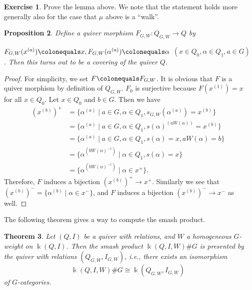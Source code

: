 \documentclass{surv-l}
\makeatletter
\DeclareRobustCommand{\forcelinebreak}{%
    \@ifstar{\unskip\\\ignorespaces}{\unskip\linebreak}%
}
\numberwithin{equation}{chapter}
\numberwithin{figure}{chapter}
\theoremstyle{plain}
\newtheorem{thm}{Theorem}[section]
\newtheorem{prp}[thm]{Proposition}
\theoremstyle{definition}
\newtheorem{exc}[thm]{Exercise}
\theoremstyle{remark}
\makeatother
\begin{document}
\begin{exc}
Prove the lemma above.
We note that the statement holds more generally also for the
case that $\mu$ above is a ``walk''.
\end{exc}

\begin{prp}\label{prp:can-cover}
Define a quiver morphism $F_{G,W} \colon Q_{G,W} \to Q$ by\forcelinebreak
$F_{G,W}(x^{(a)})\linebreak[3] \colonequals  x, F_{G,W}(\alpha^{(a)})\colonequals  \alpha$ $(x \in Q_0, \alpha \in Q_1, a \in G)$.
Then this turns out to be a covering of the quiver $Q$.
\end{prp}

\begin{proof}
For simplicity, we set $F\colonequals  F_{G,W}$.
It is obvious that $F$ is a quiver morphism by definition of $Q_{G,W}$.
$F_0$ is surjective because $F(x^{(1)}) = x$ for all $x \in Q_0$.
Let $x \in Q_0$ and $b \in G$.
Then we have
\[
\begin{aligned}
(x^{(b)})^+ &= \{\alpha^{(a)} \mid a \in G, \alpha \in Q_1, s_{G,W}(\alpha^{(a)}) = x^{(b)}\}\\
&= \{\alpha^{(a)} \mid a \in G, \alpha \in Q_1, s(\alpha)^{(aW(\alpha))} = x^{(b)}\}\\
&= \{\alpha^{(a)} \mid a \in G, \alpha \in Q_1, s(\alpha) = x, aW(\alpha) = b\}\\
&= \{\alpha^{(bW(\alpha)^{-1})} \mid  \alpha \in Q_1, s(\alpha) = x\}\\
&= \{\alpha^{(bW(\alpha)^{-1})} \mid  \alpha \in x^+\}.
\end{aligned}
\]
Therefore, $F$ induces a bijection $(x^{(b)})^+ \to x^+$.
Similarly we see that $(x^{(b)})^- = \{\alpha^{(b)} \mid  \alpha \in x^-\}$, and
$F$ induces a bijection $(x^{(b)})^- \to x^-$ as well.
\end{proof}

The following theorem gives a way to compute the smash product.

\begin{thm}
\label{thm:quiv-pres-sm-prod}
Let $(Q, I)$ be a quiver with relations, and $W$ a homogeneous $G$-weight on $\Bbbk(Q, I)$.
Then the smash product $\Bbbk(Q, I, W)\# G$ is presented by the quiver with relations
$(Q_{G,W},I_{G,W})$, i.e., there exists an isomorphism
\begin{equation*}
\Bbbk(Q, I, W)\# G\cong \Bbbk(Q_{G,W},I_{G,W})
\end{equation*}
of $G$-categories.
\end{thm}
\end{document}
